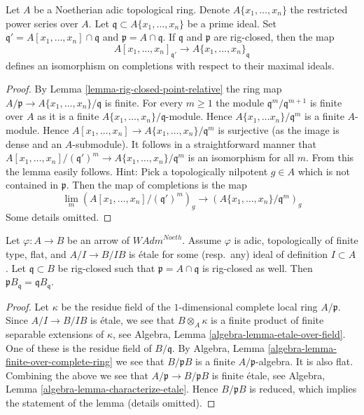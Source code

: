 \begin{lemma}
\label{lemma-rig-closed-point-variables}
Let $A$ be a Noetherian adic topological ring. Denote $A\{x_1, \ldots, x_n\}$
the restricted power series over $A$. Let
$\mathfrak q \subset A\{x_1, \ldots, x_n\}$ be a prime ideal.
Set $\mathfrak q' = A[x_1, \ldots, x_n] \cap \mathfrak q$ and
$\mathfrak p = A \cap \mathfrak q$. If $\mathfrak q$ and $\mathfrak p$
are rig-closed, then the map
$$
A[x_1, \ldots, x_n]_{\mathfrak q'}
\to
A\{x_1, \ldots, x_n\}_\mathfrak q
$$
defines an isomorphism on completions with respect to their maximal ideals.
\end{lemma}

\begin{proof}
By Lemma \ref{lemma-rig-closed-point-relative} the ring map
$A/\mathfrak p \to A\{x_1, \ldots, x_n\}/\mathfrak q$ is finite.
For every $m \geq 1$ the module $\mathfrak q^m/\mathfrak q^{m + 1}$
is finite over $A$ as it is a finite
$A\{x_1, \ldots, x_n\}/\mathfrak q$-module.
Hence $A\{x_1, \ldots x_n\}/\mathfrak q^m$ is a finite $A$-module.
Hence $A[x_1, \ldots, x_n] \to A\{x_1, \ldots, x_n\}/\mathfrak q^m$
is surjective (as the image is dense and an $A$-submodule).
It follows in a straightforward manner that
$A[x_1, \ldots, x_n]/(\mathfrak q')^m \to A\{x_1, \ldots, x_n\}/\mathfrak q^m$
is an isomorphism for all $m$. From this the lemma easily follows.
Hint: Pick a topologically nilpotent $g \in A$ which is not contained
in $\mathfrak p$. Then the map of completions is the map
$$
\lim_m \left(A[x_1, \ldots, x_n]/(\mathfrak q')^m\right)_g
\longrightarrow
\left(A\{x_1, \ldots, x_n\}/\mathfrak q^m\right)_g
$$
Some details omitted.
\end{proof}

\begin{lemma}
\label{lemma-rig-closed-point-etale}
Let $\varphi : A \to B$ be an arrow of $\textit{WAdm}^{Noeth}$.
Assume $\varphi$ is adic, topologically of finite type, flat,
and $A/I \to B/IB$ is \'etale for some (resp.\ any)
ideal of definition $I \subset A$. Let $\mathfrak q \subset B$
be rig-closed such that $\mathfrak p = A \cap \mathfrak q$
is rig-closed as well. Then
$\mathfrak p B_\mathfrak q = \mathfrak q B_\mathfrak q$.
\end{lemma}

\begin{proof}
Let $\kappa$ be the residue field of the $1$-dimensional complete
local ring $A/\mathfrak p$. Since $A/I \to B/IB$ is \'etale, we see that
$B \otimes_A \kappa$ is a finite product of finite separable
extensions of $\kappa$, see
Algebra, Lemma \ref{algebra-lemma-etale-over-field}.
One of these is the residue field of $B/\mathfrak q$.
By Algebra, Lemma \ref{algebra-lemma-finite-over-complete-ring} we see that
$B/\mathfrak p B$ is a finite $A/\mathfrak p$-algebra.
It is also flat. Combining the above
we see that $A/\mathfrak p  \to B /\mathfrak p B$
is finite \'etale, see
Algebra, Lemma \ref{algebra-lemma-characterize-etale}.
Hence $B/\mathfrak p B$ is reduced, which implies the statement of
the lemma (details omitted).
\end{proof}

